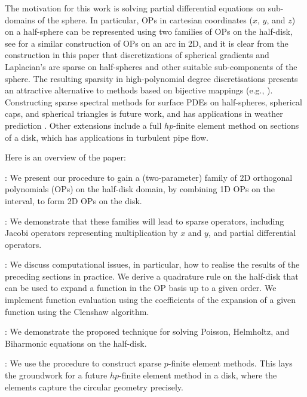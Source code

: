 \documentclass[11pt, oneside]{article}   	%
\begin{document}
The motivation for this work is solving partial differential equations on sub-domains of the sphere. In particular, OPs in cartesian coordinates ($x$, $y$, and $z$) on a half-sphere  can be represented using two families of OPs on the half-disk, see \cite[Theorem 3.1]{olver2018orthogonal} for a similar construction of OPs on an arc in 2D, and it is clear from the construction in this paper that discretizations of spherical gradients and Laplacian's are sparse on half-spheres and other suitable sub-components of the sphere. The resulting sparsity in high-polynomial degree discretisations presents an attractive alternative to methods based on bijective mappings (e.g., \cite{DGShallowWater,FEMShallowWater}).
%
Constructing sparse spectral methods for surface PDEs on half-spheres, spherical caps, and spherical triangles is future work, and has applications in weather prediction \cite{staniforth2012horizontal}. Other extensions include a full $hp$-finite element method on sections of a disk, which has applications in turbulent pipe flow.

Here is an overview of the paper:  

\noindent {}: We present our procedure  to gain a (two-parameter) family of 2D orthogonal polynomials (OPs) on the half-disk domain, by combining 1D OPs on the interval, to form 2D OPs on the disk. 

\noindent{}: We demonstrate that these families will lead to sparse operators, including Jacobi operators representing multiplication by $x$ and $y$, and partial differential operators.

\noindent{}: We discuss computational issues, in particular, how to realise the results of the preceding sections in practice.  We  derive a quadrature rule on the half-disk that can be used to expand a function in the OP basis up to a given order.  We implement function evaluation using the coefficients of the expansion of a given function using the Clenshaw algorithm.

\noindent{}: We demonstrate the proposed technique for solving Poisson, Helmholtz, and Biharmonic equations on the half-disk.  

\noindent{}: We use the procedure to construct sparse $p$-finite element methods. This lays the groundwork for a future $hp$-finite element method in a disk, where the elements capture the circular geometry precisely.
\end{document}
